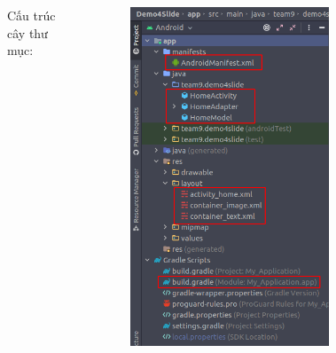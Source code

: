 \documentclass{beamer}
\begin{document}
\begin{frame}
\begin{columns}
\begin{figure}
        \end{figure}
        \indent Cấu trúc cây thư mục:
        \begin{figure}
            \centering
            \includegraphics[height=0.68\textheight]{images/11.png}
        \end{figure}
    \end{columns}
\end{frame}
\end{document}
